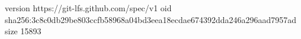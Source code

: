 version https://git-lfs.github.com/spec/v1
oid sha256:3c8c0db29be803ccfb58968a04bd3eea18ecdae674392dda246a296aad7957ad
size 15893
